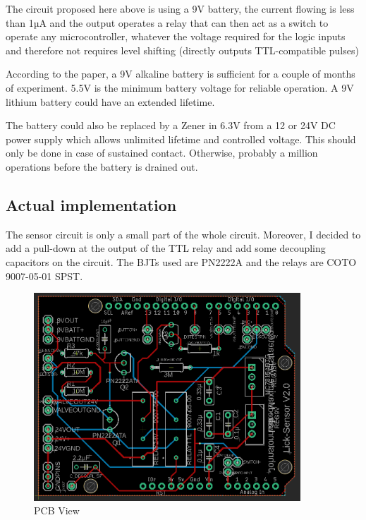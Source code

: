\documentclass[a4paper]{article}
\begin{document}
The circuit proposed here above is using a 9V battery, the current flowing is less than 1µA and the output operates a relay that can then act as a switch to operate any microcontroller, whatever the voltage required for the logic inputs and therefore not requires level shifting (directly outputs TTL-compatible pulses)

According to the paper, a 9V alkaline battery is sufficient for a couple of months of experiment. 5.5V is the minimum battery voltage for reliable operation. A 9V lithium battery could have an extended lifetime.

The battery could also be replaced by a Zener in 6.3V from a 12 or 24V DC power supply which allows unlimited lifetime and controlled voltage. This should only be done in case of sustained contact. Otherwise, probably a million operations before the battery is drained out.

\subsection{Actual implementation}
The sensor circuit is only a small part of the whole circuit. Moreover, I decided to add a pull-down at the output of the TTL relay and add some decoupling capacitors on the circuit.
The BJTs used are PN2222A and the relays are COTO 9007-05-01 SPST.

\begin{figure}[h!]
    \centering
    \includegraphics[width = 10cm]{images/schematic.PNG}
    \caption{PCB View}
    \label{fig:schematic}
\end{figure}
\end{document}
